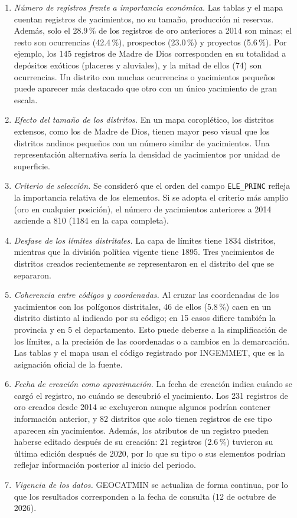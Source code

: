 \documentclass[man,12pt,a4paper,floatsintext,donotrepeattitle]{apa7}
\begin{document}
\begin{enumerate}
  \item \textit{Número de registros frente a importancia económica.} Las tablas
  y el mapa cuentan registros de yacimientos, no su tamaño, producción ni
  reservas. Además, solo el 28.9\,\% de los registros de oro anteriores a 2014
  son minas; el resto son ocurrencias (42.4\,\%), prospectos (23.0\,\%) y
  proyectos (5.6\,\%). Por
  ejemplo, los 145 registros de Madre de Dios corresponden en su totalidad a
  depósitos exóticos (placeres y aluviales), y la mitad de ellos (74) son
  ocurrencias. Un distrito con muchas ocurrencias o yacimientos pequeños puede
  aparecer más destacado que otro con un único yacimiento de gran escala.
  \item \textit{Efecto del tamaño de los distritos.} En un mapa coroplético, los
  distritos extensos, como los de Madre de Dios, tienen mayor peso visual que los
  distritos andinos pequeños con un número similar de yacimientos. Una
  representación alternativa sería la densidad de yacimientos por unidad de
  superficie.
  \item \textit{Criterio de selección.} Se consideró que el orden del campo
  \texttt{ELE\_PRINC} refleja la importancia relativa de los elementos. Si se
  adopta el criterio más amplio (oro en cualquier posición), el número de
  yacimientos anteriores a 2014 asciende a 810 (1184 en la capa completa).
  \item \textit{Desfase de los límites distritales.} La capa de límites tiene
  1834 distritos, mientras que la división política vigente tiene 1895. Tres
  yacimientos de distritos creados recientemente se representaron en el
  distrito del que se separaron.
  \item \textit{Coherencia entre códigos y coordenadas.} Al cruzar las
  coordenadas de los yacimientos con los polígonos distritales, 46 de ellos
  (5.8\,\%) caen en un distrito distinto al indicado por su código; en 15 casos
  difiere también la provincia y en 5 el departamento. Esto puede deberse a la
  simplificación de los límites, a la precisión de las coordenadas o a cambios
  en la demarcación. Las tablas y el mapa usan el código registrado por
  INGEMMET, que es la asignación oficial de la fuente.
  \item \textit{Fecha de creación como aproximación.} La fecha de creación
  indica cuándo se cargó el registro, no cuándo se descubrió el yacimiento. Los
  231 registros de oro creados desde 2014 se excluyeron aunque algunos podrían
  contener información anterior, y 82 distritos que solo tienen registros de ese
  tipo aparecen sin yacimientos. Además, los atributos de un registro pueden
  haberse editado después de su creación: 21 registros (2.6\,\%) tuvieron su
  última edición después de 2020, por lo que su tipo o sus elementos podrían
  reflejar información posterior al inicio del periodo.
  \item \textit{Vigencia de los datos.} GEOCATMIN se actualiza de forma
  continua, por lo que los resultados corresponden a la fecha de consulta (12
  de octubre de 2026).
\end{enumerate}
\end{document}
